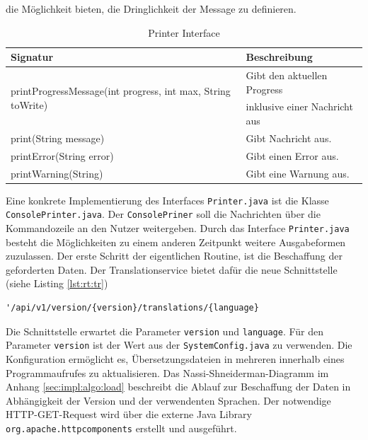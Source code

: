 \documentclass[10pt, oneside]{article}
\begin{document}
    die Möglichkeit bieten, die Dringlichkeit der Message zu definieren.\\
    \begin{table}[ht]
      \centering
      \begin{tabular}{l l}
        \hline
        \rowcolor{carolinablue}
        Signatur & Beschreibung \\
        \hline
        \multirow{2}{*}{printProgressMessage(int progress, int max, String toWrite)} & Gibt den aktuellen Progress \\ & inklusive einer Nachricht aus\\
        \rowcolor{lightgray}
        print(String message) & Gibt Nachricht aus.\\
        printError(String error) & Gibt einen Error aus.\\
        \rowcolor{lightgray}
        printWarning(String) & Gibt eine Warnung aus.
      \end{tabular}
      \caption{Printer Interface}
      \label{tab:impl:tu:output}
    \end{table}
    Eine konkrete Implementierung des Interfaces \lstinline{Printer.java} ist die Klasse \lstinline{ConsolePrinter.java}. Der \lstinline{ConsolePriner} soll die Nachrichten über
    die Kommandozeile an den Nutzer weitergeben. Durch das Interface \lstinline{Printer.java} besteht die Möglichkeiten zu einem anderen Zeitpunkt weitere Ausgabeformen zuzulassen.
    \newpage
    Der erste Schritt der eigentlichen Routine, ist die Beschaffung der geforderten Daten. Der Translationservice bietet dafür die neue Schnittstelle (siehe Listing \ref{lst:rt:tr})
    \begin{center}
      \begin{lstlisting}[caption={Export Translations}, captionpos=b, label=lst:rt:tr]
        '/api/v1/version/{version}/translations/{language}
      \end{lstlisting}
    \end{center}
    Die Schnittstelle erwartet die Parameter \lstinline{version} und \lstinline{language}. Für den Parameter \lstinline{version} ist der Wert aus der \lstinline{SystemConfig.java} zu verwenden.
    Die Konfiguration ermöglicht es, Übersetzungsdateien in mehreren innerhalb eines Programmaufrufes zu aktualisieren. Das Nassi-Shneiderman-Diagramm im Anhang \ref{sec:impl:algo:load} beschreibt die Ablauf zur Beschaffung der Daten in Abhängigkeit der Version und der 
    verwendenten Sprachen. 
    Der notwendige HTTP-GET-Request wird über die externe Java Library \lstinline{org.apache.httpcomponents} erstellt und ausgeführt. 
\end{document}
